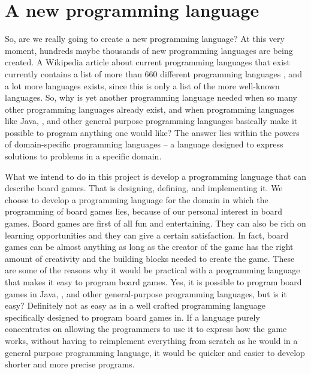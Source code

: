 \chapter{A new programming language}
\label{chap:introduction}

So, are we really going to create a new programming language? At this very
moment, hundreds maybe thousands of new programming languages are being created.
A Wikipedia article about current programming languages that exist currently
contains a list of more than $660$ different programming languages
\cite{listofprogramminglanguages}, and a lot more languages exists, since this
is only a list of the more well-known languages. So, why is yet another
programming language needed when so many other programming languages
already exist, and when programming languages like Java, \CS{}, and other general purpose
programming languages basically make it possible to program anything one would
like? The answer lies within the powers of domain-specific programming languages
-- a language designed to express solutions to problems in a specific domain.
\cite{domainspecificprogramminglanguagedefinition}

What we intend to do in this project is develop a programming language that can
describe board games. That is designing, defining, and implementing it. We
choose to develop a programming language for the domain in which the programming
of board games lies, because of our personal interest in board games.
Board games are first of all fun and entertaining. They can also be rich on
learning opportunities \cite{whyboardgames1?} and they can give a certain
satisfaction. \cite{whyboardgames2?} In fact, board games can be almost anything
as long as the creator of the game has the right amount of creativity and the
building blocks needed to create the game. These are some of the reasons why it
would be practical with a programming language that makes it easy to program
board games. Yes, it is possible to program board games in Java, \CS{}, and 
other general-purpose programming languages, but is it easy? Definitely not as
easy as in a well crafted programming language specifically designed to program
board games in. If a language purely concentrates on allowing the programmers to
use it to express how the game works, without having to reimplement everything
from scratch as he would in a general purpose programming language, it would be
quicker and easier to develop shorter and more precise programs.  

